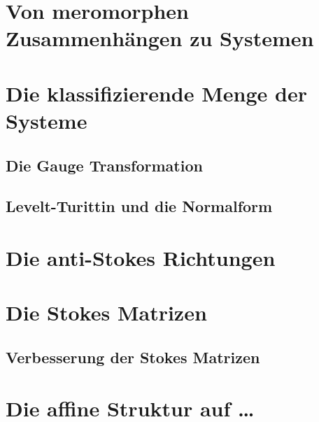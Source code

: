 \section{Von meromorphen Zusammenhängen zu Systemen}
\section{Die klassifizierende Menge der Systeme}
\subsection{Die Gauge Transformation}
\subsection{Levelt-Turittin und die Normalform}
\section{Die anti-Stokes Richtungen}
\section{Die Stokes Matrizen}
\subsection{Verbesserung der Stokes Matrizen}
\section{Die affine Struktur auf \dots}

